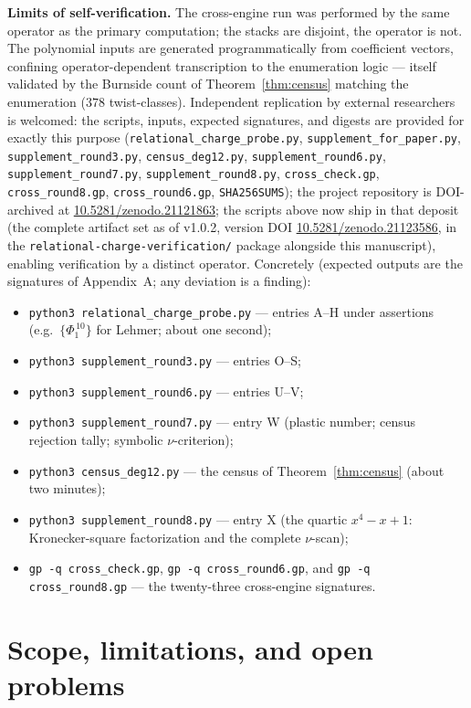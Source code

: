 \documentclass[11pt]{article}
\theoremstyle{plain}
\theoremstyle{definition}
\theoremstyle{remark}
\begin{document}
\textbf{Limits of self-verification.} The cross-engine run was performed by
the same operator as the primary computation; the stacks are disjoint, the
operator is not. The polynomial inputs are generated programmatically from
coefficient vectors, confining operator-dependent transcription to the
enumeration logic --- itself validated by the Burnside count of
Theorem~\ref{thm:census} matching the enumeration ($378$ twist-classes).
Independent replication by external researchers is welcomed:
the scripts, inputs, expected signatures, and digests are provided for
exactly this purpose (\texttt{relational\_charge\_probe.py},
\texttt{supplement\_for\_paper.py}, \texttt{supplement\_round3.py},
\texttt{census\_deg12.py}, \texttt{supplement\_round6.py},
\texttt{supplement\_round7.py}, \texttt{supplement\_round8.py},
\texttt{cross\_check.gp}, \texttt{cross\_round8.gp},
\texttt{cross\_round6.gp}, \texttt{SHA256SUMS}); the project repository is DOI-archived at
\url{10.5281/zenodo.21121863}; the scripts above now ship in that deposit
(the complete artifact set as of v1.0.2, version DOI
\url{10.5281/zenodo.21123586}, in the \texttt{relational-charge-verification/}
package alongside this manuscript), enabling verification by a distinct operator. Concretely (expected
outputs are the signatures of Appendix~A; any deviation is a finding):
\begin{itemize}
\item \texttt{python3 relational\_charge\_probe.py} --- entries A--H under
assertions (e.g.\ $\{\Phi_1^{\,10}\}$ for Lehmer; about one second);
\item \texttt{python3 supplement\_round3.py} --- entries O--S;
\item \texttt{python3 supplement\_round6.py} --- entries U--V;
\item \texttt{python3 supplement\_round7.py} --- entry W (plastic number;
census rejection tally; symbolic $\nu$-criterion);
\item \texttt{python3 census\_deg12.py} --- the census of
Theorem~\ref{thm:census} (about two minutes);
\item \texttt{python3 supplement\_round8.py} --- entry X (the quartic
$x^4-x+1$: Kronecker-square factorization and the complete $\nu$-scan);
\item \texttt{gp -q cross\_check.gp}, \texttt{gp -q cross\_round6.gp}, and
\texttt{gp -q cross\_round8.gp}
--- the twenty-three cross-engine signatures.
\end{itemize}

\section{Scope, limitations, and open problems}\label{sec:open}
\end{document}

